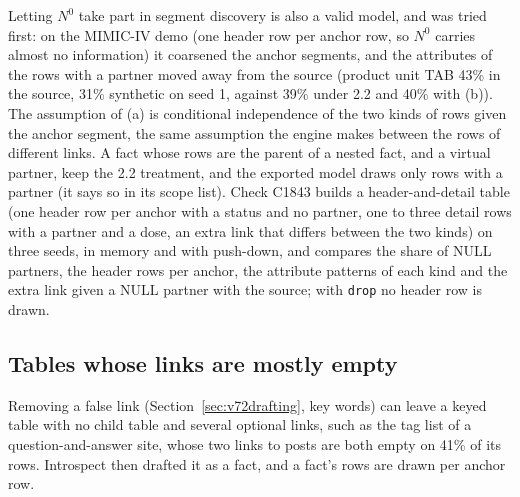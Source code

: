 \noindent Letting $N^0$ take part in segment discovery is also a valid model, and was tried first: on the MIMIC-IV demo (one header row per anchor row, so $N^0$ carries almost no information) it coarsened the anchor segments, and the attributes of the rows with a partner moved away from the source (product unit TAB 43\% in the source, 31\% synthetic on seed 1, against 39\% under 2.2 and 40\% with (b)). The assumption of (a) is conditional independence of the two kinds of rows given the anchor segment, the same assumption the engine makes between the rows of different links. A fact whose rows are the parent of a nested fact, and a virtual partner, keep the 2.2 treatment, and the exported model draws only rows with a partner (it says so in its scope list). Check C1843 builds a header-and-detail table (one header row per anchor with a status and no partner, one to three detail rows with a partner and a dose, an extra link that differs between the two kinds) on three seeds, in memory and with push-down, and compares the share of NULL partners, the header rows per anchor, the attribute patterns of each kind and the extra link given a NULL partner with the source; with \texttt{drop} no header row is drawn.

\subsection*{Tables whose links are mostly empty}
Removing a false link (Section~\ref{sec:v72drafting}, key words) can leave a keyed table with no child table and several optional links, such as the tag list of a question-and-answer site, whose two links to posts are both empty on 41\% of its rows. Introspect then drafted it as a fact, and a fact's rows are drawn per anchor row.


